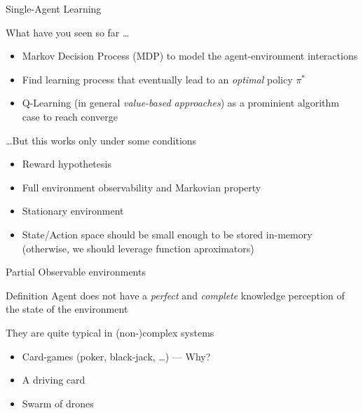 \documentclass[presentation]{beamer}\mode<presentation>{\usetheme{AMSBolognaFC}}
\begin{document}
\begin{frame}[c, fragile]{Single-Agent Learning}
\begin{exampleblock}{What have you seen so far \dots}
	\begin{itemize}
		\item Markov Decision Process (MDP) to model the agent-environment interactions
		\item Find learning process that eventually lead to an \emph{optimal} policy $\pi^*$
		\item Q-Learning (in general \emph{value-based approaches}) as a prominient algorithm case to reach converge
	\end{itemize}
\end{exampleblock}
\begin{alertblock}{\dots But this works only under some conditions}
	\begin{itemize}
		\item Reward hypothetesis
		\item Full environment observability and Markovian property
		\item Stationary environment
		\item State/Action space should be small enough to be stored in-memory (otherwise, we should leverage function aproximators)
	\end{itemize}	
\end{alertblock}
\end{frame}
\begin{frame}{Partial Observable environments}
	\begin{alertblock}{Definition}
		Agent does not have a \emph{perfect} and \emph{complete} knowledge perception of the state of the environment
	\end{alertblock}
	\begin{exampleblock}{They are quite typical in (non-)complex systems}
		\begin{itemize}
			\item Card-games (poker, black-jack, \dots) --- Why?
			\item A driving card
			\item Swarm of drones
		\end{itemize}
	\end{exampleblock}
\end{frame}
\end{document}
